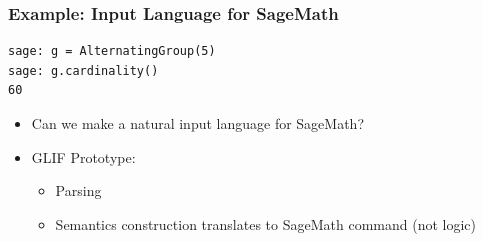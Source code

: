 \begin{frame}[fragile]
    \frametitle{Example: Input Language for SageMath}
    {\centering\begin{adjustbox}{}
    \begin{lstlisting}
sage: g = AlternatingGroup(5)
sage: g.cardinality()
60
    \end{lstlisting}
    \end{adjustbox}\par
    \vspace{1em}
    \par
}

    \vspace{2em}
    \begin{itemize}
        \item Can we make a natural input language for SageMath?
        \item GLIF Prototype:
            \begin{itemize}
                \item Parsing
                \item Semantics construction translates to SageMath command (not logic)
            \end{itemize}
    \end{itemize}
\end{frame}

